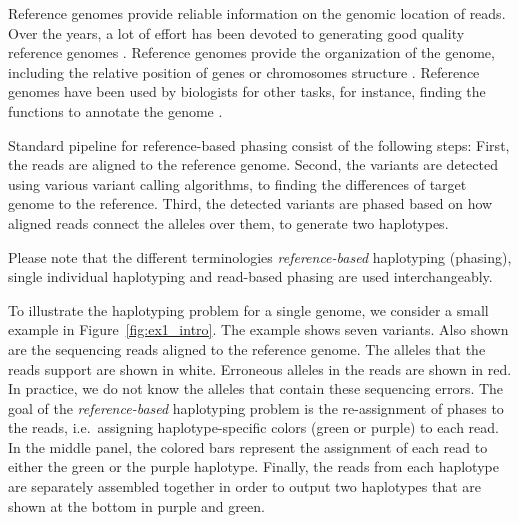 Reference genomes provide reliable information on the genomic location of reads. 
Over the years, a lot of effort has been devoted to generating good quality reference genomes \citep{10002010map, international2005haplotype}.
 Reference genomes provide the organization of the genome,
including the relative position of genes or chromosomes structure \citep{encode2004encode}. 
Reference genomes have been used by biologists for other tasks, for instance, finding the functions to annotate the genome \citep{harrow2012gencode}.

Standard pipeline for reference-based phasing consist of the following steps: 
First, the reads are aligned to the reference genome. Second, the variants are detected using various variant calling algorithms, to finding the differences of target genome to the reference.
Third, the detected variants are phased based on how aligned reads connect the alleles over them, to generate two haplotypes.

Please note that the different terminologies \textit{reference-based} haplotyping (phasing), single individual haplotyping and read-based phasing are used interchangeably.



 To illustrate the haplotyping problem for a single genome, we consider a small example in Figure~\ref{fig:ex1_intro}. The example shows seven variants. Also shown are the sequencing reads aligned to the reference genome.
 The alleles that the reads support are shown in white. 
 Erroneous alleles in the reads are shown in red. In practice, we do not know the alleles that contain these sequencing errors. 
 The goal of the \textit{reference-based} haplotyping problem is the re-assignment of phases to the reads, i.e.\, assigning haplotype-specific colors (green or purple) to each read. 
 In the middle panel, the colored bars represent the assignment of each read to either the green or the purple haplotype.
 Finally, the reads from each haplotype are separately assembled together in order to output two haplotypes that are shown at the bottom in purple and green.



